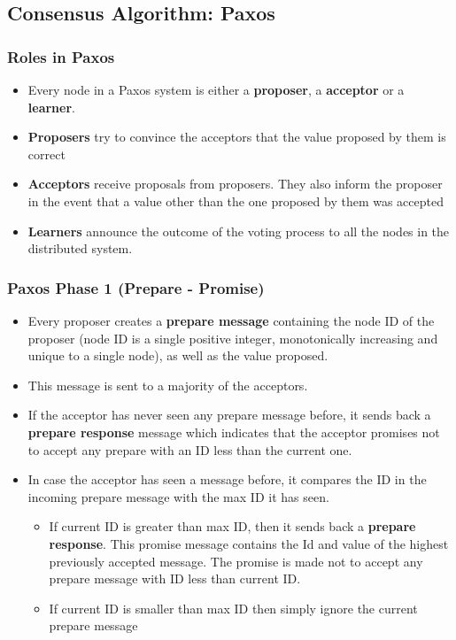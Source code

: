 \documentclass{article}
\begin{document}
\subsection{Consensus Algorithm: Paxos}
\subsubsection{Roles in Paxos}
\begin{itemize}
    \item Every node in a Paxos system is either a \textbf{proposer}, a \textbf{acceptor} or a \textbf{learner}.
    
    \item \textbf{Proposers} try to convince the acceptors that the value proposed by them is correct
    
    \item \textbf{Acceptors} receive proposals from proposers. They also inform the proposer in the event that a value other than the one proposed by them was accepted
    
    \item \textbf{Learners} announce the outcome of the voting process to all the nodes in the distributed system. 
\end{itemize}

\subsubsection{Paxos Phase 1 (Prepare - Promise)}
\begin{itemize}
    \item Every proposer creates a \textbf{prepare message} containing the node ID of the proposer (node ID is a single positive integer, monotonically increasing and unique to a single node), as well as the value proposed. 
    
    \item This message is sent to a majority of the acceptors. 
    
    \item If the acceptor has never seen any prepare message before, it sends back a \textbf{prepare response} message which indicates that the acceptor promises not to accept any prepare with an ID less than the current one. 
    
    \item In case the acceptor has seen a message before, it compares the ID in the incoming prepare message with the max ID it has seen. 
    \begin{itemize}
        \item If current ID is greater than max ID, then it sends back a \textbf{prepare response}. This promise message contains the Id and value of the highest previously accepted message. The promise is made not to accept any prepare message with ID less than current ID. 
        
        \item If current ID is smaller than max ID then simply ignore the current prepare message
    \end{itemize}
\end{itemize}
\end{document}
